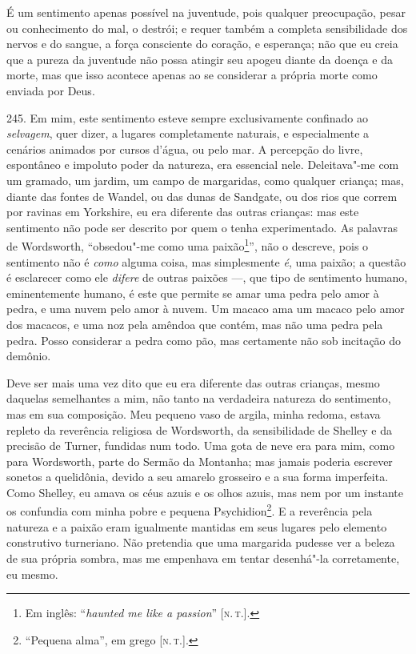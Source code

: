 É um sentimento apenas possível na juventude, pois qualquer preocupação,
pesar ou conhecimento do mal, o destrói; e requer também a completa
sensibilidade dos nervos e do sangue, a força consciente do coração, e
esperança; não que eu creia que a pureza da juventude não possa atingir
seu apogeu diante da doença e da morte, mas que isso acontece apenas ao
se considerar a própria morte como enviada por Deus.

245. Em mim, este sentimento esteve sempre exclusivamente confinado ao
\emph{selvagem}, quer dizer, a lugares completamente naturais, e
especialmente a cenários animados por cursos d'água, ou pelo mar. A
percepção do livre, espontâneo e impoluto poder da natureza, era
essencial nele. Deleitava"-me com um gramado, um jardim, um campo de
margaridas, como qualquer criança; mas, diante das fontes de Wandel, ou
das dunas de Sandgate, ou dos rios que correm por ravinas em Yorkshire,
eu era diferente das outras crianças: mas este sentimento não pode ser
descrito por quem o tenha experimentado. As palavras de Wordsworth,
``obsedou"-me como uma paixão\footnote{Em inglês: ``\emph{haunted me like
  a passion}'' {[}\textsc{n.\,t.}{]}.}'', não o descreve, pois o sentimento não
é \emph{como} alguma coisa, mas simplesmente \emph{é}, uma paixão; a
questão é esclarecer como ele \emph{difere} de outras paixões ---, que
tipo de sentimento humano, eminentemente humano, é este que permite se
amar uma pedra pelo amor à pedra, e uma nuvem pelo amor à nuvem. Um
macaco ama um macaco pelo amor dos macacos, e uma noz pela amêndoa que
contém, mas não uma pedra pela pedra. Posso considerar a pedra como pão,
mas certamente não sob incitação do demônio.

Deve ser mais uma vez dito que eu era diferente das outras crianças,
mesmo daquelas semelhantes a mim, não tanto na verdadeira natureza do
sentimento, mas em sua composição. Meu pequeno vaso de argila, minha
redoma, estava repleto da reverência religiosa de Wordsworth, da
sensibilidade de Shelley e da precisão de Turner, fundidas num todo. Uma
gota de neve era para mim, como para Wordsworth, parte do Sermão da
Montanha; mas jamais poderia escrever sonetos a quelidônia, devido a seu
amarelo grosseiro e a sua forma imperfeita. Como Shelley, eu amava os
céus azuis e os olhos azuis, mas nem por um instante os confundia com
minha pobre e pequena Psychidion\footnote{``Pequena alma'', em grego
  {[}\textsc{n.\,t.}{]}.}. E a reverência pela natureza e a paixão eram
igualmente mantidas em seus lugares pelo elemento construtivo
turneriano. Não pretendia que uma margarida pudesse ver a beleza de sua
própria sombra, mas me empenhava em tentar desenhá"-la corretamente, eu
mesmo.

